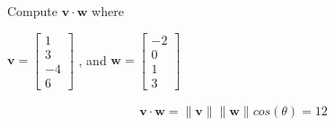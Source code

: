 Compute $\boldsymbol{v} \cdot \boldsymbol{w}$ where

\begin{center}
    $\boldsymbol{v} = 
    \begin{bmatrix}
        1 \\ 3 \\ -4 \\ 6
    \end{bmatrix}$
    , and $\boldsymbol{w} = \begin{bmatrix}
        -2 \\ 0 \\ 1 \\ 3
    \end{bmatrix}$
\end{center}

\begin{solution}

\begin{align*}
\boldsymbol{v} \cdot \boldsymbol{w} = \|\boldsymbol{v}\| \|\boldsymbol{w}\| cos(\theta) = 12
\end{align*}

\end{solution}